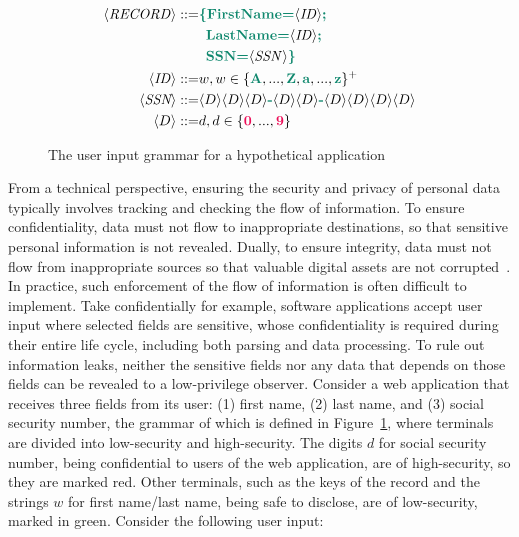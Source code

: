 \begin{figure}[tbp]
  \small
  \begin{align*}
    \langle \mathit{RECORD} \rangle ::= & {\color{green} \textbf{\{FirstName=}} \langle \mathit{ID} \rangle {\color{green} \textbf{;}} \\
                               & \enspace {\color{green} \textbf{LastName=}} \langle \mathit{ID} \rangle {\color{green} \textbf{;}} \\
                               & \enspace {\color{green} \textbf{SSN=}} \langle \mathit{SSN} \rangle {\color{green} \textbf{\}}} \\
    \langle \mathit{ID} \rangle     ::= & w , w \in \{ {\color{green} \textbf{A}}, ..., {\color{green} \textbf{Z}}, {\color{green} \textbf{a}}, ..., {\color{green} \textbf{z}} \}^{+} \\
    \langle \textit{SSN} \rangle    ::= & \langle D \rangle \langle D \rangle \langle D \rangle {\color{green} \textbf{-}}
                                 \langle D \rangle \langle D \rangle {\color{green} \textbf{-}}
                                 \langle D \rangle \langle D \rangle \langle D \rangle \langle D \rangle \\
    \langle D \rangle      ::= & d , d \in \{ {\color{red} \textbf{0}}, ..., {\color{red} \textbf{9}} \}
  \end{align*}
  \caption{The user input grammar for a hypothetical application}
  \label{fig:grammar}
\end{figure}

From a technical perspective, ensuring the security and privacy of personal data
typically involves tracking and checking the flow of information. To ensure
confidentiality, data must not flow to inappropriate destinations, so that
sensitive personal information is not revealed. Dually, to ensure integrity,
data must not flow from inappropriate sources so that valuable digital assets
are not corrupted~\cite{sabelfeld2003language,biba1977integrity}. In practice,
such enforcement of the flow of information is often difficult to implement.
Take confidentially for example, software applications accept user input where
selected fields are sensitive, whose confidentiality is required during their
entire life cycle, including both parsing and data processing. To rule out
information leaks, neither the sensitive fields nor any data that depends on
those fields can be revealed to a low-privilege observer. Consider a web
application that receives three fields from its user: (1) first name, (2) last
name, and (3) social security number, the grammar of which is defined in
Figure~\ref{fig:grammar}, where terminals are divided into low-security and
high-security. The digits $d$ for social security number, being confidential to
users of the web application, are of high-security, so they are marked
{\color{red} red}. Other terminals, such as the keys of the record and the
strings $w$ for first name/last name, being safe to disclose, are of
low-security, marked in {\color{green} green}. Consider the following user
input:

